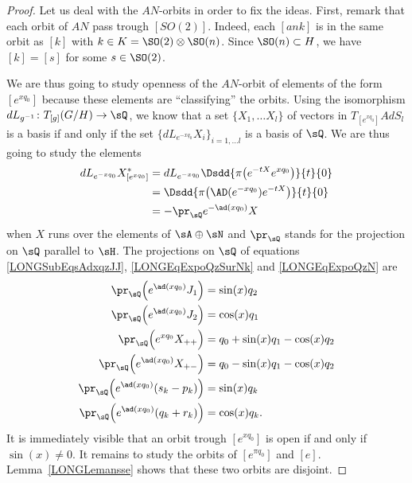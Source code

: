\begin{proof}
    Let us deal with the $AN$-orbits in order to fix the ideas. First, remark that each orbit of $AN$ pass trough $[SO(2)]$. Indeed, each $[ank]$ is in the same orbit as $[k]$ with $k\in K=\SO(2)\otimes\SO(n)$. Since $\SO(n)\subset H$, we have $[k]=[s]$ for some $s\in\SO(2)$.

    We are thus going to study openness of the $AN$-orbit of elements of the form $[e^{x q_0}]$ because these elements are ``classifying'' the orbits. Using the isomorphism $  dL_{g^{-1}}\colon T_{[g]}(G/H)\to \sQ$, we know that a set $\{ X_1,\ldots X_l \}$ of vectors in $T_{[ e^{x q_0}]}AdS_l$ is a basis if and only if the set $\{ dL_{ e^{-xq_0}}X_i \}_{i=1,\ldots l}$ is a basis of $\sQ$. We are thus going to study the elements
    \begin{equation}
        \begin{aligned}[]
            dL_{ e^{-xq_0}}X^*_{[ e^{xq_0}]}    &=dL_{ e^{-xq_0}}\Dsdd{ \pi\big(  e^{-t X} e^{xq_0} \big) }{t}{0}\\
                                &=\Dsdd{ \pi\big(  \AD( e^{-xq_0} ) e^{-tX} \big) }{t}{0}\\
                                &=-\pr_{\sQ} e^{-\ad(xq_0)}X
        \end{aligned}
    \end{equation}
    when $X$ runs over the elements of $\sA\oplus \sN$ and $\pr_{\sQ}$ stands for the projection on $\sQ$ parallel to $\sH$.
    The projections on $\sQ$ of equations \eqref{LONGSubEqsAdxqzJJ}, \eqref{LONGEqExpoQzSurNk} and \eqref{LONGEqExpoQzN} are
    \begin{subequations}        \label{LONGSubEqsExpAdxqDivers}
        \begin{align}
            \pr_{\sQ}\Big( e^{\ad(xq_0)}J_1\Big)&=\sin(x)q_2\\
            \pr_{\sQ}\Big( e^{\ad(xq_0)}J_2\Big)&=\cos(x)q_1\\
            \pr_{\sQ}\Big(  e^{xq_0}X_{++} \Big)&=q_0+\sin(x)q_1-\cos(x)q_2\\
            \pr_{\sQ} \Big(   e^{\ad(xq_0)}X_{+-} \Big)&=q_0-\sin(x)q_1-\cos(x)q_2\\
            \pr_{\sQ}\Big(  e^{\ad(xq_0)}(s_k-p_k) \Big)&= \sin(x)q_k\\
            \pr_{\sQ}\Big(  e^{\ad(xq_0)}(q_k+r_k) \Big)&=\cos(x)q_k.
        \end{align}
    \end{subequations}
    It is immediately visible
    that an orbit trough $[ e^{xq_0}]$ is open if and only if $\sin(x)\neq 0$. It remains to study the orbits of $[ e^{\pi q_0}]$ and $[e]$. Lemma~\ref{LONGLemansse} shows that these two orbits are disjoint.


\end{proof}

